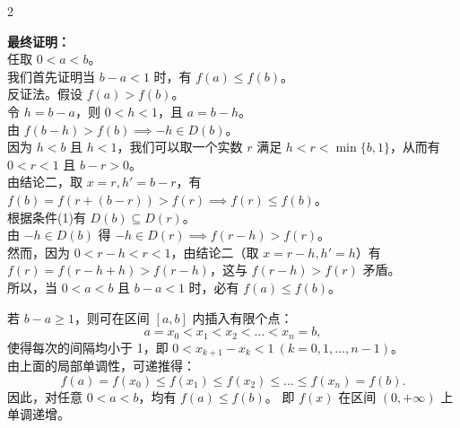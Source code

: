 \documentclass[11pt,a4paper]{ctexart}
\begin{document}
\begin{paracol}{2}
{  \textbf{最终证明：}\\
  任取 $0 < a < b$。\\
  我们首先证明当 $b - a < 1$ 时，有 $f(a) \le f(b)$。\\
  反证法。假设 $f(a) > f(b)$。\\
  令 $h = b - a$，则 $0 < h < 1$，且 $a = b - h$。\\
  由 $f(b - h) > f(b) \implies -h \in D(b)$。\\
  因为 $h < b$ 且 $h < 1$，我们可以取一个实数 $r$ 满足 $h < r < \min\{b, 1\}$，从而有 $0 < r < 1$ 且 $b - r > 0$。\\
  由结论二，取 $x = r, h' = b - r$，有 $f(b) = f(r + (b-r)) > f(r) \implies f(r) \le f(b)$。\\
  根据条件(1)有 $D(b) \subseteq D(r)$。\\
  由 $-h \in D(b)$ 得 $-h \in D(r) \implies f(r - h) > f(r)$。\\
  然而，因为 $0 < r - h < r < 1$，由结论二（取 $x = r-h, h' = h$）有 $f(r) = f(r-h+h) > f(r-h)$，这与 $f(r-h) > f(r)$ 矛盾。\\
  所以，当 $0 < a < b$ 且 $b - a < 1$ 时，必有 $f(a) \le f(b)$。

  若 $b - a \ge 1$，则可在区间 $[a, b]$ 内插入有限个点：
  \[
  a = x_0 < x_1 < x_2 < \dots < x_n = b,
  \]
  使得每次的间隔均小于 1，即 $0 < x_{k+1} - x_k < 1 \ (k=0, 1, \dots, n-1)$。\\
  由上面的局部单调性，可递推得：
  \[
  f(a) = f(x_0) \le f(x_1) \le f(x_2) \le \dots \le f(x_n) = f(b).
  \]
  因此，对任意 $0 < a < b$，均有 $f(a) \le f(b)$。
  即 $f(x)$ 在区间 $(0, +\infty)$ 上单调递增。
}

\switchcolumn
{}


\end{paracol}
\end{document}
